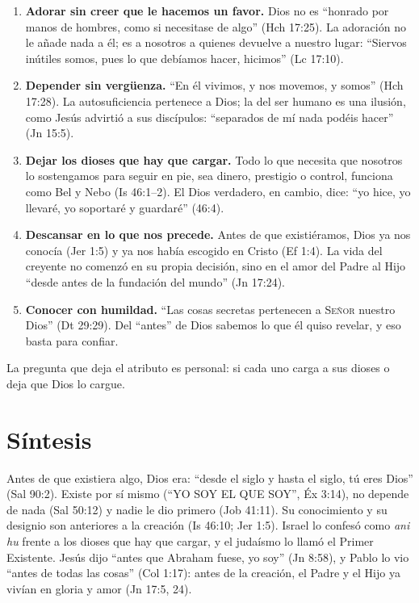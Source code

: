 \documentclass[11pt,letterpaper]{article}
\newcommand{\SENOR}{\textsc{Señor}}
\begin{document}
\begin{enumerate}
\item \textbf{Adorar sin creer que le hacemos un favor.} Dios no es ``honrado por manos de hombres, como si necesitase de algo'' (Hch 17:25). La adoración no le añade nada a él; es a nosotros a quienes devuelve a nuestro lugar: ``Siervos inútiles somos, pues lo que debíamos hacer, hicimos'' (Lc 17:10).
\item \textbf{Depender sin vergüenza.} ``En él vivimos, y nos movemos, y somos'' (Hch 17:28). La autosuficiencia pertenece a Dios; la del ser humano es una ilusión, como Jesús advirtió a sus discípulos: ``separados de mí nada podéis hacer'' (Jn 15:5).
\item \textbf{Dejar los dioses que hay que cargar.} Todo lo que necesita que nosotros lo sostengamos para seguir en pie, sea dinero, prestigio o control, funciona como Bel y Nebo (Is 46:1--2). El Dios verdadero, en cambio, dice: ``yo hice, yo llevaré, yo soportaré y guardaré'' (46:4).
\item \textbf{Descansar en lo que nos precede.} Antes de que existiéramos, Dios ya nos conocía (Jer 1:5) y ya nos había escogido en Cristo (Ef 1:4). La vida del creyente no comenzó en su propia decisión, sino en el amor del Padre al Hijo ``desde antes de la fundación del mundo'' (Jn 17:24).
\item \textbf{Conocer con humildad.} ``Las cosas secretas pertenecen a \SENOR{} nuestro Dios'' (Dt 29:29). Del ``antes'' de Dios sabemos lo que él quiso revelar, y eso basta para confiar.
\end{enumerate}

La pregunta que deja el atributo es personal: si cada uno carga a sus dioses o deja que Dios lo cargue.

\section{Síntesis}

\begin{tcolorbox}[colback=papiro,colframe=azul,boxrule=1pt,arc=3pt]
Antes de que existiera algo, Dios era: ``desde el siglo y hasta el siglo, tú eres Dios'' (Sal 90:2). Existe por sí mismo (``YO SOY EL QUE SOY'', Éx 3:14), no depende de nada (Sal 50:12) y nadie le dio primero (Job 41:11). Su conocimiento y su designio son anteriores a la creación (Is 46:10; Jer 1:5). Israel lo confesó como \emph{ani hu} frente a los dioses que hay que cargar, y el judaísmo lo llamó el Primer Existente. Jesús dijo ``antes que Abraham fuese, yo soy'' (Jn 8:58), y Pablo lo vio ``antes de todas las cosas'' (Col 1:17): antes de la creación, el Padre y el Hijo ya vivían en gloria y amor (Jn 17:5, 24).
\end{tcolorbox}
\end{document}
